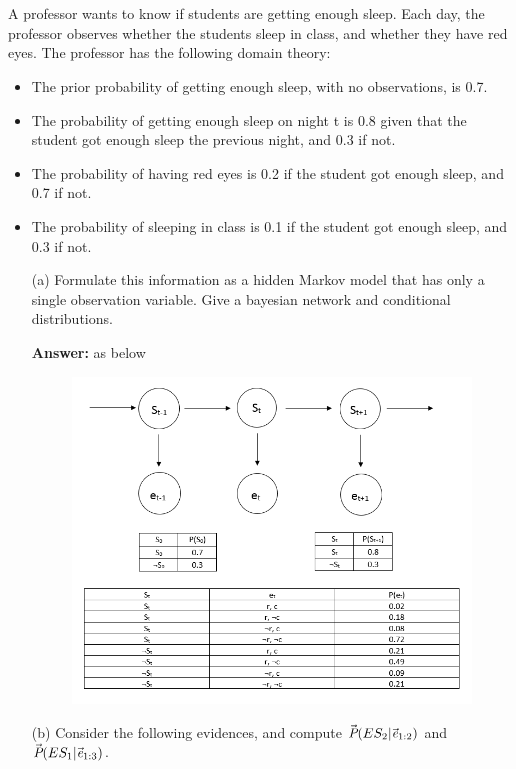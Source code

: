 \documentclass{article}
\begin{document}
\section{}A professor wants to know if students are getting enough sleep. Each day, the professor observes whether the students sleep in class, and whether they have red eyes. The professor has the following domain theory:
	\begin{itemize}
	\item The prior probability of getting enough sleep, with no observations, is 0.7.
	\item The probability of getting enough sleep on night t is 0.8 given that the student got enough sleep the previous night, and 0.3 if not.
	\item The probability of having red eyes is 0.2 if the student got enough sleep, and 0.7 if not.
	\item The probability of sleeping in class is 0.1 if the student got enough sleep, and 0.3 if not.
	\item[(a)]Formulate this information as a hidden Markov model that has only a single observation variable. Give a bayesian network and conditional distributions.
	\item[\textbf{Answer:}]as below
		\begin{figure}[h!]
		\centering
		\includegraphics[width=1\textwidth]{hmm.png}
		\end{figure}
	\item[(b)]Consider the following evidences, and compute $\vec{\textit P}(ES_{2}\vert\vec{\textit e}_{1:2})$ and $\vec{\textit P}(ES_{1}\vert\vec{\textit e}_{1:3})$.

\end{itemize}
\end{document}
